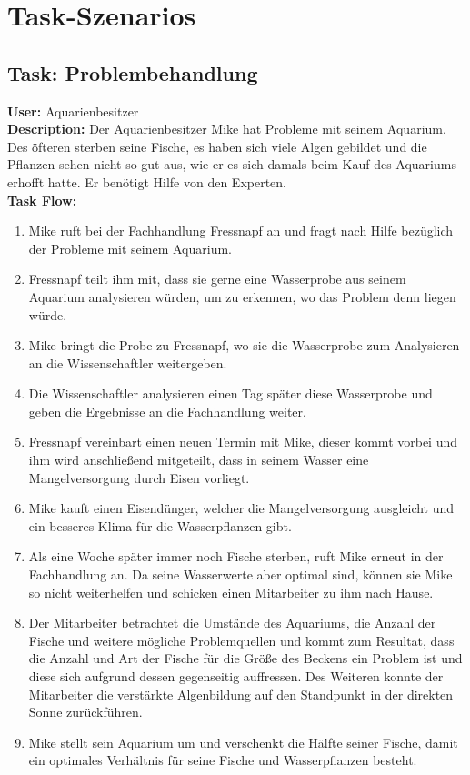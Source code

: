\section{Task-Szenarios}
\subsection{Task: Problembehandlung}
\textbf{User:} Aquarienbesitzer\\

\textbf{Description:} Der Aquarienbesitzer Mike hat Probleme mit seinem Aquarium. Des öfteren sterben seine Fische, es haben sich viele Algen gebildet und die Pflanzen sehen nicht so gut aus, wie er es sich damals beim Kauf des Aquariums erhofft hatte. Er benötigt Hilfe von den Experten.\\

\textbf{Task Flow:}
\begin{enumerate}
\item Mike ruft bei der Fachhandlung Fressnapf an und fragt nach Hilfe bezüglich der Probleme mit seinem Aquarium. 
 \item Fressnapf teilt ihm mit, dass sie gerne eine Wasserprobe aus seinem Aquarium analysieren würden, um zu erkennen, wo das Problem denn liegen würde.
 \item Mike bringt die Probe zu Fressnapf, wo sie die Wasserprobe zum Analysieren an die Wissenschaftler weitergeben.
 \item Die Wissenschaftler analysieren einen Tag später diese Wasserprobe und geben die Ergebnisse an die Fachhandlung weiter.
 \item Fressnapf vereinbart einen neuen Termin mit Mike, dieser kommt vorbei und ihm wird anschließend mitgeteilt, dass in seinem Wasser eine Mangelversorgung durch Eisen vorliegt. 
 \item Mike kauft einen Eisendünger, welcher die Mangelversorgung ausgleicht und ein besseres Klima für die Wasserpflanzen gibt.
 \item Als eine Woche später immer noch Fische sterben, ruft Mike erneut in der Fachhandlung an. Da seine Wasserwerte aber optimal sind, können sie Mike so nicht weiterhelfen und schicken einen Mitarbeiter zu ihm nach Hause.
 \item Der Mitarbeiter betrachtet die Umstände des Aquariums, die Anzahl der Fische und weitere mögliche Problemquellen und kommt zum Resultat, dass die Anzahl und Art der Fische für die Größe des Beckens ein Problem ist und diese sich aufgrund dessen gegenseitig auffressen. Des Weiteren konnte der Mitarbeiter die verstärkte Algenbildung auf den Standpunkt in der direkten Sonne zurückführen.
 \item Mike stellt sein Aquarium um und verschenkt die Hälfte seiner Fische, damit ein optimales Verhältnis für seine Fische und Wasserpflanzen besteht.
\end{enumerate}


